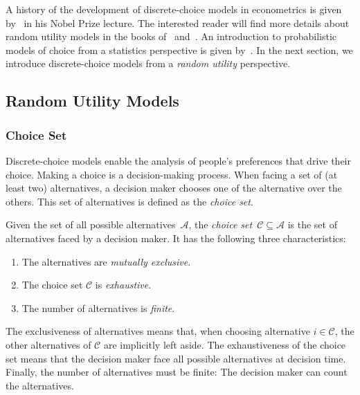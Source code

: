 A history of the development of discrete-choice models in econometrics is given by~\citet{mcfadden2001economic} in his Nobel Prize lecture.
The interested reader will find more details about random utility models in the books of~\citet[Chapter~1]{train2009discrete} and~\citet[Chapter~3]{hensher2005applied}.
An introduction to probabilistic models of choice from a statistics perspective is given by~\citet[Chapter~1]{maystre2018efficient}.
In the next section, we introduce discrete-choice models from a \emph{random utility} perspective.

\subsection{Random Utility Models}

\subsubsection{Choice Set}
Discrete-choice models enable the analysis of people's preferences that drive their choice.
Making a choice is a decision-making process.
When facing a set of (at least two) alternatives, a decision maker chooses one of the alternative over the others.
This set of alternatives is defined as the \emph{choice set}.

\begin{definition}
	Given the set of all possible alternatives~$\mathcal{A}$, the \emph{choice set}~$\mathcal{C} \subseteq \mathcal{A}$ is the set of alternatives faced by a decision maker.
	It has the following three characteristics:
	\begin{enumerate}
		\item The alternatives are \emph{mutually exclusive}.
		\item The choice set $\mathcal{C}$ is \emph{exhaustive}.
		\item The number of alternatives is \emph{finite}.
	\end{enumerate}
\end{definition}

The exclusiveness of alternatives means that, when choosing alternative $i \in \mathcal{C}$, the other alternatives of $\mathcal{C}$ are implicitly left aside.
The exhaustiveness of the choice set means that the decision maker face all possible alternatives at decision time.
Finally, the number of alternatives must be finite:
The decision maker can count the alternatives.

